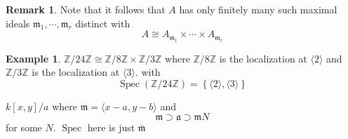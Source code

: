 \documentclass[11pt,a4paper]{article}
\theoremstyle{definition}
\newtheorem{example}[definition]{Example}
\newtheorem{remark}[definition]{Remark}
\theoremstyle{plain}
\theoremstyle{remark}
\newcommand{\Z}{\mathbb{Z}}
\renewcommand{\set}[1]{\left\{ #1 \right\}}
\newcommand{\angles}[1]{\langle #1 \rangle}
\newcommand{\Spec}{\operatorname{Spec}}
\begin{document}
\begin{remark}
    Note that it follows that $A$ has only finitely many such maximal ideals 
    $\mathfrak{m_1}, \cdots, \mathfrak{m}_r$ distinct with 
    $$A \cong A_{\mathfrak{m}_1} \times \cdots \times A_{\mathfrak{m}_r}$$
\end{remark}

\begin{example}
    $\Z / 24 \Z \cong \Z / 8 \Z \times \Z / 3 \Z$ where $\Z / 8 \Z$ is the localization at $\angles{2}$ and 
    $\Z / 3 \Z$ is the localization at $\angles{3}$. with 
    $$\Spec (\Z / 24 \Z) = \set{\angles{2}, \angles{3}}$$

    $k[x,y] /a$ where $\mathfrak{m} = \angles{x-a, y-b}$ and 
    $$\mathfrak{m} \supset \mathfrak{a} \supset \mathfrak{m}N$$
    for some $N$. $\Spec$ here is just $\overline{\mathfrak{m}}$
\end{example}
\end{document}
